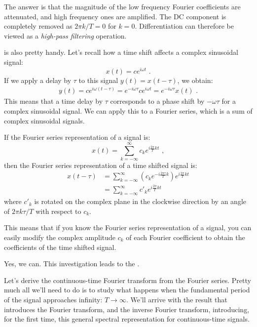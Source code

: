 The answer is that the magnitude of the low frequency Fourier coefficients are attenuated, and high frequency ones are amplified. The DC component is completely removed as $2\pi k/T = 0$ for $k=0$. 
Differentiation can therefore be viewed as a \emph{high-pass filtering} operation.

 is also pretty handy. 
Let's recall how a time shift affects a complex sinusoidal signal:
\begin{equation}
x(t) = c e^{i\omega t} \,\,.
\end{equation}
If we apply a delay by $\tau$ to this signal $y(t) = x(t-\tau)$, we obtain:
\begin{align}
y(t)  = c e^{i\omega (t-\tau)} =  e^{-i\omega \tau} c e^{i\omega t} = e^{-i\omega \tau} x(t) \,\,.
\end{align}
This means that a time delay by $\tau$ corresponds to a phase shift by $-\omega\tau$ for a complex sinusoidal signal. We can apply this to a Fourier series, which is a sum of complex sinusoidal signals.

If the Fourier series representation of a signal is:
\begin{equation}
x(t) = \sum_{k=-\infty}^{\infty} c_k e^{i\frac{2\pi}{T}kt} \,\,,
\end{equation}
then the Fourier series representation of a time shifted signal is:
\begin{align}
x(t-\tau) & = \sum_{k=-\infty}^{\infty} \left(c_k e^{-i \frac{2\pi \tau}{T} k}\right) e^{i\frac{2\pi}{T}kt}\label{eq:time_shift_phasor}\\
          &=  \sum_{k=-\infty}^{\infty} c'_k e^{i\frac{2\pi}{T}kt}
\end{align}
where $c'_k$ is rotated on the complex plane in the clockwise direction by an angle of $2\pi k\tau/T$ with respect to $c_k$.

This means that if you know the Fourier series representation of a signal, you can easily modify the complex amplitude $c_k$ of each Fourier coefficient to obtain the coefficients of the time shifted signal.

 Yes, we can. This investigation leads to the \emph{}.

Let's derive the continuous-time Fourier transform from the Fourier series. Pretty much all we'll need to do is to study what happens when the fundamental period of the signal approaches infinity: $T\rightarrow \infty$.  We'll arrive with the result that introduces the Fourier transform, and the inverse Fourier transform, introducing, for the first time, this general spectral representation for continuous-time signals.

